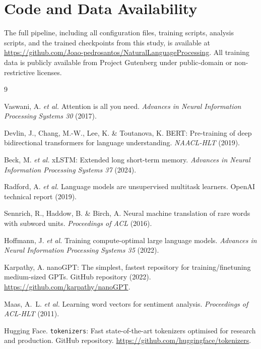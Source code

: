 \documentclass[11pt]{article}
\begin{document}
\section*{Code and Data Availability}

The full pipeline, including all configuration files, training
scripts, analysis scripts, and the trained checkpoints from this study,
is available at\\
\url{https://github.com/Joao-pedrosantos/NaturalLanguageProcessing}.
All training data is publicly available from Project Gutenberg under
public-domain or non-restrictive licenses.

\begin{thebibliography}{9}

Vaswani, A. \emph{et al.}
Attention is all you need.
\emph{Advances in Neural Information Processing Systems 30} (2017).

Devlin, J., Chang, M.-W., Lee, K. \& Toutanova, K.
BERT: Pre-training of deep bidirectional transformers for language
understanding.
\emph{NAACL-HLT} (2019).

Beck, M. \emph{et al.}
xLSTM: Extended long short-term memory.
\emph{Advances in Neural Information Processing Systems 37} (2024).

Radford, A. \emph{et al.}
Language models are unsupervised multitask learners.
OpenAI technical report (2019).

Sennrich, R., Haddow, B. \& Birch, A.
Neural machine translation of rare words with subword units.
\emph{Proceedings of ACL} (2016).

Hoffmann, J. \emph{et al.}
Training compute-optimal large language models.
\emph{Advances in Neural Information Processing Systems 35} (2022).

Karpathy, A.
nanoGPT: The simplest, fastest repository for training/finetuning
medium-sized GPTs.
GitHub repository (2022). \url{https://github.com/karpathy/nanoGPT}.

Maas, A.~L. \emph{et al.}
Learning word vectors for sentiment analysis.
\emph{Proceedings of ACL-HLT} (2011).

Hugging Face.
\texttt{tokenizers}: Fast state-of-the-art tokenizers optimised for
research and production.
GitHub repository.
\url{https://github.com/huggingface/tokenizers}.


\end{thebibliography}
\end{document}
